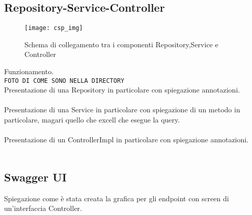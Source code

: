 \subsection{Repository-Service-Controller}

\begin{figure}[H] 
    \centering 
    \texttt{[image: csp\_img]} 
    \caption{Schema di collegamento tra i componenti Repository,Service e Controller}
\end{figure}

\noindent Funzionamento.\\

\noindent \texttt{FOTO DI COME SONO NELLA DIRECTORY}\\

\noindent Presentazione di una Repository in particolare con spiegazione annotazioni.\\\\
Presentazione di una Service in particolare con spiegazione di un metodo in particolare, magari quello che excell che esegue la query.\\\\
Presentazione di un ControllerImpl in particolare con spiegazione annotazioni.\\\\

\subsection{Swagger UI}
Spiegazione come è stata creata la grafica per gli endpoint con screen di un'interfaccia Controller.